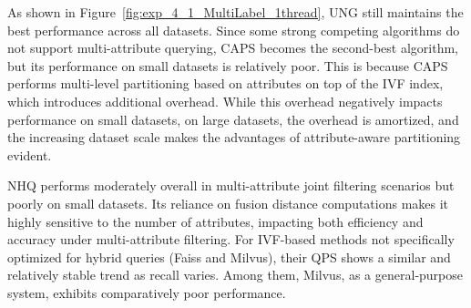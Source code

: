 \documentclass[sigconf, nonacm]{acmart}
\begin{document}
{	As shown in Figure~\ref{fig:exp_4_1_MultiLabel_1thread}, UNG still maintains the best performance across all datasets. Since some strong competing algorithms do not support multi-attribute querying, CAPS becomes the second-best algorithm, but its performance on small datasets is relatively poor. This is because CAPS performs multi-level partitioning based on attributes on top of the IVF index, which introduces additional overhead. While this overhead negatively impacts performance on small datasets, on large datasets, the overhead is amortized, and the increasing dataset scale makes the advantages of attribute-aware partitioning evident.
	
	NHQ performs moderately overall in multi-attribute joint filtering scenarios but poorly on small datasets. Its reliance on fusion distance computations makes it highly sensitive to the number of attributes, impacting both efficiency and accuracy under multi-attribute filtering.
	For IVF-based methods not specifically optimized for hybrid queries (Faiss and Milvus), their QPS shows a similar and relatively stable trend as recall varies. Among them, Milvus, as a general-purpose system, exhibits comparatively poor performance.
	
}
\end{document}
